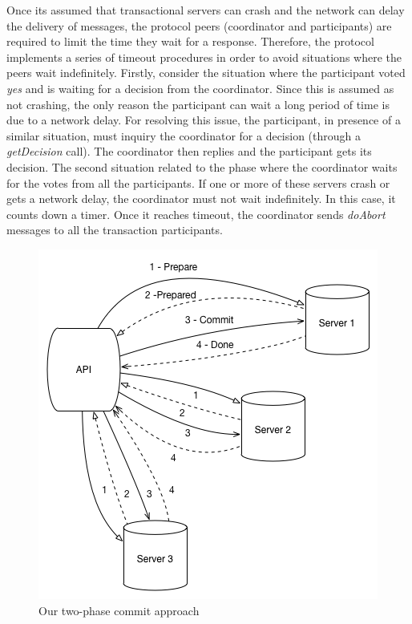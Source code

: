 \documentclass[times, 10pt,twocolumn]{article}
\begin{document}
Once its assumed that transactional servers can crash and the network can delay the delivery of messages, the protocol peers (coordinator and participants) are required to limit the time they wait for a response. Therefore, the protocol implements a series of timeout procedures in order to avoid situations where the peers wait indefinitely. 
Firstly, consider the situation where the participant voted \emph{yes} and is waiting for a decision from the coordinator. Since this is assumed as not crashing, the only reason the participant can wait a long period of time is due to a network delay. For resolving this issue, the participant, in presence of a similar situation, must inquiry the coordinator for a decision (through a \emph{getDecision} call). The coordinator then replies and the participant gets its decision.
The second situation related to the phase where the coordinator waits for the votes from all the participants. If one or more of these servers crash or gets a network delay, the coordinator must not wait indefinitely. In this case, it counts down a timer. Once it reaches timeout, the coordinator sends \emph{doAbort} messages to all the transaction participants.

\begin{figure}[h!]
	\centering
	\includegraphics[scale=0.45]{2PC.png}
	\caption{Our two-phase commit approach}
\end{figure}

\end{document}

